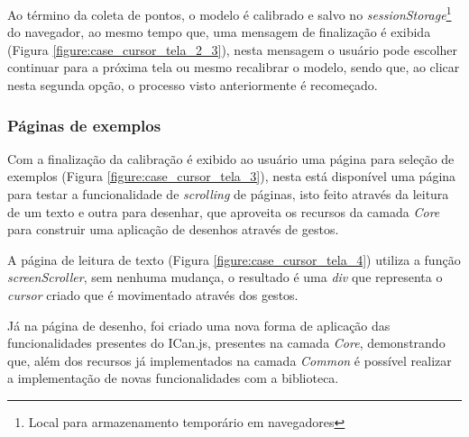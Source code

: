 
\par Ao término da coleta de pontos, o modelo é calibrado e salvo no \textit{sessionStorage}\footnote{Local para armazenamento temporário em navegadores} do navegador, ao mesmo tempo que, uma mensagem de finalização é exibida (Figura \ref{figure:case_cursor_tela_2_3}), nesta mensagem o usuário pode escolher continuar para a próxima tela ou mesmo recalibrar o modelo, sendo que, ao clicar nesta segunda opção, o processo visto anteriormente é recomeçado.


\subsubsection{Páginas de exemplos}

\par Com a finalização da calibração é exibido ao usuário uma página para seleção de exemplos (Figura \ref{figure:case_cursor_tela_3}), nesta está disponível uma página para testar a funcionalidade de \textit{scrolling} de páginas, isto feito através da leitura de um texto e outra para desenhar, que aproveita os recursos da camada \textit{Core} para construir uma aplicação de desenhos através de gestos.


\par A página de leitura de texto (Figura \ref{figure:case_cursor_tela_4}) utiliza a função \textit{screenScroller}, sem nenhuma mudança, o resultado é uma \textit{div} que representa o \textit{cursor} criado que é movimentado através dos gestos.


\par Já na página de desenho, foi criado uma nova forma de aplicação das funcionalidades presentes do ICan.js, presentes na camada \textit{Core}, demonstrando que, além dos recursos já implementados na camada \textit{Common} é possível realizar a implementação de novas funcionalidades com a biblioteca.

